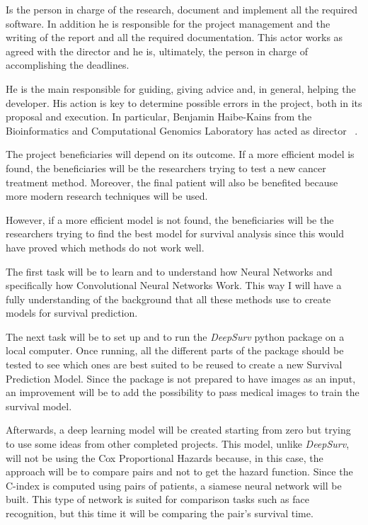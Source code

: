 
Is the person in charge of the research, document and implement all the required software.
In addition he is responsible for the project management and the writing of the report
and all the required documentation. This actor works as agreed with the director and
he is, ultimately, the person in charge of accomplishing the deadlines.

He is the main responsible for guiding, giving advice and, in general, helping the developer.
His action is key to determine possible errors in the project, both in its proposal and 
execution. In particular, Benjamin Haibe-Kains from the Bioinformatics and Computational
Genomics Laboratory has acted as director
~\cites{bhklab}.

The project beneficiaries will depend on its outcome. If a more efficient model is found, the
beneficiaries will be the researchers trying to test a new cancer treatment method. Moreover,
the final patient will also be benefited because more modern research techniques will be used.

However, if a more efficient model is not found, the beneficiaries will be the researchers
trying to find the best model for survival analysis since this would have proved which 
methods do not work well.


The first task will be to learn and to understand how Neural Networks and specifically how 
Convolutional Neural Networks Work. This way I will have a fully understanding of the background
that all these methods use to create models for survival prediction.

The next task will be to set up and to run the \emph{DeepSurv} python package on a local
computer. Once running, all the different parts of the package should be tested to see which
ones are best suited to be reused to create a new Survival Prediction Model. Since the package
is not prepared to have images as an input, an improvement will be to add the possibility to 
pass medical images to train the survival model.
\cite{medical:deep-surv-github}

Afterwards, a deep learning model will be created starting from zero but trying to use 
some ideas from other completed projects. This model, unlike \emph{DeepSurv}, will not be 
using the Cox Proportional Hazards because, in this case, the approach will be to compare
pairs and not to get the hazard function. Since the C-index is computed using pairs of patients, 
a siamese neural network will be built. This type of network is suited for comparison 
tasks such as face recognition, but this time it will be comparing the pair's survival time.

